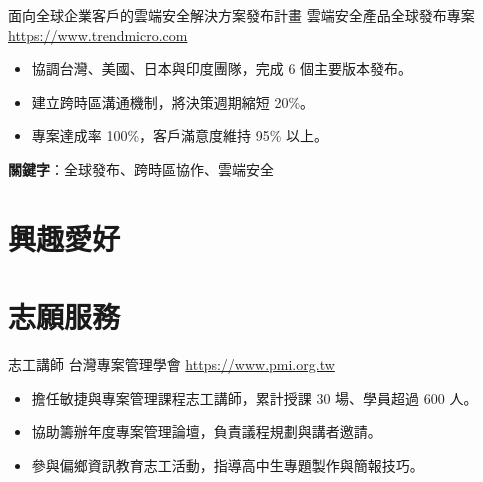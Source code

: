 \documentclass[a4paper, serif, 10pt]{moderncv}
\begin{document}
        {面向全球企業客戶的雲端安全解決方案發布計畫}
        {雲端安全產品全球發布專案}
        {\url{https://www.trendmicro.com}}
        {}
        {\begin{itemize}
\item 協調台灣、美國、日本與印度團隊，完成 6 個主要版本發布。
\item 建立跨時區溝通機制，將決策週期縮短 20\%。
\item 專案達成率 100\%，客戶滿意度維持 95\% 以上。
\end{itemize}
\textbf{關鍵字}：全球發布、跨時區協作、雲端安全}
\section{興趣愛好}

\section{志願服務}

        {志工講師}
        {台灣專案管理學會}
        {\url{https://www.pmi.org.tw}}
        {}
        {\begin{itemize}
\item 擔任敏捷與專案管理課程志工講師，累計授課 30 場、學員超過 600 人。
\item 協助籌辦年度專案管理論壇，負責議程規劃與講者邀請。
\item 參與偏鄉資訊教育志工活動，指導高中生專題製作與簡報技巧。
\end{itemize}}
    
\end{document}
